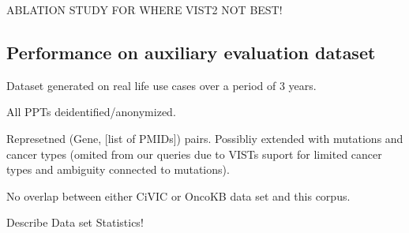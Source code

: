 \documentclass[fleqn,10pt]{wlscirep}
\begin{document}
ABLATION STUDY FOR WHERE VIST2 NOT BEST!

\subsection*{Performance on auxiliary evaluation dataset}

Dataset generated on real life use cases over a period of 3 years. 

All PPTs deidentified/anonymized. 

Represetned (Gene, [list of PMIDs]) pairs. Possibliy extended with mutations and cancer types (omited from our queries due to VISTs suport for limited cancer types and ambiguity connected to mutations). 

No overlap between either CiVIC or OncoKB data set and this corpus.

Describe Data set Statistics!
\end{document}
